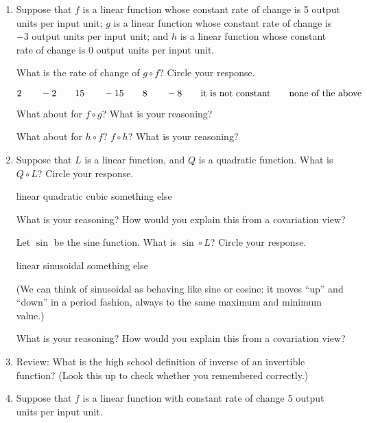 \documentclass[11pt]{article}
\newcommand\tn{\textnormal}
\theoremstyle{definition}
\begin{document}
\begin{enumerate}
\item 
Suppose that $f$ is a linear function whose constant rate of change is 5 output units per input unit; $g$ is a linear function whose constant rate of change is $-3$ output units per input unit; and $h$ is a linear function whose constant rate of change is $0$ output units per input unit.

What is the rate of change of $g\circ f$? Circle your response.

	$$2 \quad\quad -2 \quad\quad 15 \quad\quad -15 \quad\quad 8 \quad\quad -8\quad\quad \tn{it is not constant} \quad\quad \tn{none of the above}$$

What about for $f\circ g$? What is your reasoning? 

What about for $h\circ f$?  $f\circ h$? What is your reasoning?

\vfill 

\item Suppose that $L$ is a linear function, and $Q$ is a quadratic function.  What is $Q\circ L$? Circle your response.


\begin{center}
linear \quad\quad quadratic \quad\quad cubic \quad\quad something else
\end{center}

What is your reasoning? How would you explain this from a covariation view?

Let $\sin$ be the sine function. What is $\sin\circ L$? Circle your response.

\begin{center}
linear \quad\quad sinusoidal \quad\quad something else
\end{center}

(We can think of sinusoidal as behaving like sine or cosine: it moves ``up'' and ``down'' in a period fashion, always to the same maximum and minimum value.)

What is your reasoning? How would you explain this from a covariation view?

\vfill 

\item Review: What is the high school definition of inverse of an invertible function? (Look this up to check whether you remembered correctly.)

\vfill 
\item Suppose that $f$ is a linear function with constant rate of change 5 output units per input unit. 


\end{enumerate}
\end{document}
